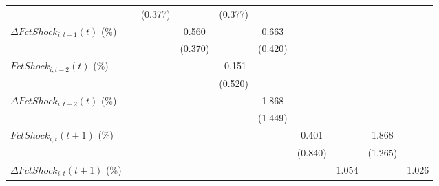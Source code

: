 {\begin{tabular}{l*{9}{c}}
                    &                     &     (0.377)         &                     &     (0.377)         &                     &                     &                     &                     &                     \\
\addlinespace
$ \Delta FctShock_{i,t-1}(t)$ (\%)&                     &                     &       0.560         &                     &       0.663         &                     &                     &                     &                     \\
                    &                     &                     &     (0.370)         &                     &     (0.420)         &                     &                     &                     &                     \\
\addlinespace
$ FctShock_{i,t-2}(t)$ (\%)&                     &                     &                     &      -0.151         &                     &                     &                     &                     &                     \\
                    &                     &                     &                     &     (0.520)         &                     &                     &                     &                     &                     \\
\addlinespace
$ \Delta FctShock_{i,t-2}(t)$ (\%)&                     &                     &                     &                     &       1.868         &                     &                     &                     &                     \\
                    &                     &                     &                     &                     &     (1.449)         &                     &                     &                     &                     \\
\addlinespace
$ FctShock_{i,t}(t+1)$ (\%)&                     &                     &                     &                     &                     &       0.401         &                     &       1.868         &                     \\
                    &                     &                     &                     &                     &                     &     (0.840)         &                     &     (1.265)         &                     \\
\addlinespace
$ \Delta FctShock_{i,t}(t+1)$ (\%)&                     &                     &                     &                     &                     &                     &       1.054         &                     &       1.026         \\

\end{tabular}}
